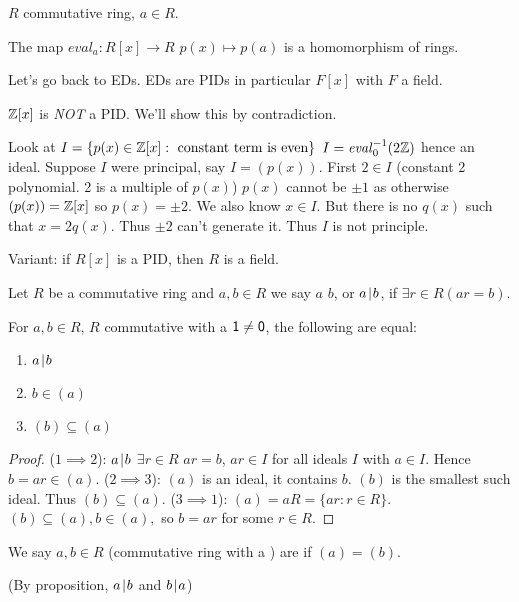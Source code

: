 \documentclass[notes.tex]{subfiles}
\begin{document}
\begin{remark}
	$R$ commutative ring, $a\in R$.

	The map $\mathit{eval}_a:R[x]\to R$ $p(x) \mapsto p(a)$ is a homomorphism of rings.
\end{remark}

Let's go back to EDs. EDs are PIDs in particular $F[x]$ with $F$ a field.

\begin{eg}
	$\mathbb{Z}[x]$ is \emph{NOT} a PID. We'll show this by contradiction.

	Look at $I = \{p(x)\in\mathbb{Z}[x] : \text{ constant term is even}\}$ $I = \mathit{eval}_0^{-1}(2\mathbb{Z})$ hence an ideal.
	Suppose $I$ were principal, say $I = (p(x))$. First $2\in I$ (constant 2 polynomial. 2 is a multiple of $p(x)$) $p(x)$ cannot be $\pm 1$ as otherwise $(p(x)) = \mathbb{Z}[x]$ so $p(x) = \pm 2$. We also know $x \in I$. But there is no $q(x)$ such that $x = 2q(x)$. Thus $\pm2$ can't generate it. Thus $I$ is not principle.

	Variant: if $R[x]$ is a PID, then $R$ is a field.
\end{eg}


\begin{defn}
	Let $R$ be a commutative ring and $a,b\in R$ we say $a$  $b$, or $a\mkern2mu|\mkern1mu b$, if $\exists r\in R (ar = b)$.
\end{defn}

\begin{proposition}
	For $a, b\in R$, $R$ commutative with a $\mathsf{1}\ne\mathsf{0}$, the following are equal:
	\begin{enumerate}
		\item $a\mkern2mu|\mkern1mu b$
		\item $b\in (a)$
		\item $(b)\subseteq (a)$
	\end{enumerate}
\end{proposition}

\begin{proof}
	($1\implies 2$):
	\tabin
		$a\mkern2mu|\mkern1mu b$ $\exists r\in R$ $ar=b$, $ar\in I$ for all ideals $I$ with $a\in I$. Hence $b=ar \in (a)$.
	\tabout
	($2\implies 3$):
	\tabin
		$(a)$ is an ideal, it contains $b$. $(b)$ is the smallest such ideal. Thus $(b)\subseteq (a)$.
	\tabout
	($3\implies 1$):
	\tabin
		$(a) = aR = \{ar:r\in R\}$. 
		$(b)\subseteq (a), b\in (a),$ so $b=ar$ for some $r\in R$. 
	\tabout
\end{proof}

\begin{defn}
	We say $a, b\in R$ (commutative ring with a \one) are  if $(a) = (b)$.

	(By proposition, $a\mkern2mu|\mkern1mu b$ and $b\mkern2mu|\mkern1mu a$)
\end{defn}
\end{document}
